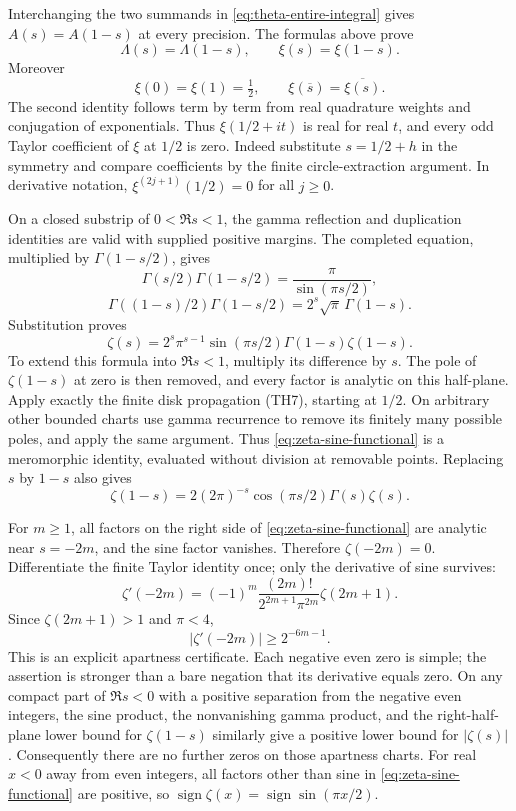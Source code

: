 Interchanging the two summands in \eqref{eq:theta-entire-integral}
gives $A(s)=A(1-s)$ at every precision.  The formulas above prove
\begin{equation}
 \boxed{\Lambda(s)=\Lambda(1-s),\qquad \xi(s)=\xi(1-s).}
 \label{eq:completed-functional-equation}
\end{equation}
Moreover
\[
 \xi(0)=\xi(1)=\tfrac12,\qquad
 \xi(\overline s)=\overline{\xi(s)}.
\]
The second identity follows term by term from real quadrature weights
and conjugation of exponentials.  Thus $\xi(1/2+it)$ is real for
real $t$, and every odd Taylor coefficient of $\xi$ at $1/2$ is zero.
Indeed substitute $s=1/2+h$ in the symmetry and compare coefficients
by the finite circle-extraction argument.  In derivative notation,
$\xi^{(2j+1)}(1/2)=0$ for all $j\ge0$.

On a closed substrip of $0<\Re s<1$, the gamma reflection and
 duplication identities are valid with supplied positive margins.
The completed equation, multiplied by $\Gamma(1-s/2)$, gives
\[
 \Gamma(s/2)\Gamma(1-s/2)=\frac\pi{\sin(\pi s/2)},
\]
\[
 \Gamma((1-s)/2)\Gamma(1-s/2)
                       =2^s\sqrt\pi\,\Gamma(1-s).
\]
Substitution proves
\begin{equation}
 \boxed{\displaystyle
 \zeta(s)=2^s\pi^{s-1}\sin(\pi s/2)
                        \Gamma(1-s)\zeta(1-s).}
 \label{eq:zeta-sine-functional}
\end{equation}
To extend this formula into $\Re s<1$, multiply its difference by
$s$.  The pole of $\zeta(1-s)$ at zero is then removed, and every
factor is analytic on this half-plane.  Apply exactly the finite
disk propagation (TH7), starting at $1/2$.  On arbitrary other bounded
charts use gamma recurrence to remove its finitely many possible
poles, and apply the same argument.  Thus
\eqref{eq:zeta-sine-functional} is a meromorphic identity, evaluated
without division at removable points.  Replacing $s$ by $1-s$ also
gives
\[
 \zeta(1-s)=2(2\pi)^{-s}\cos(\pi s/2)\Gamma(s)\zeta(s).
\]

For $m\ge1$, all factors on the right side of
\eqref{eq:zeta-sine-functional} are analytic near $s=-2m$, and the
sine factor vanishes.  Therefore $\zeta(-2m)=0$.  Differentiate the
finite Taylor identity once; only the derivative of sine survives:
\begin{equation}
 \boxed{\displaystyle
 \zeta'(-2m)=(-1)^m\frac{(2m)!}{2^{2m+1}\pi^{2m}}
                              \zeta(2m+1).}
 \label{eq:trivial-zero-derivative}
\end{equation}
Since $\zeta(2m+1)>1$ and $\pi<4$,
\[
 |\zeta'(-2m)|\ge2^{-6m-1}.                         \tag{TH11}
\]
This is an explicit apartness certificate.  Each negative even zero
is simple; the assertion is stronger than a bare negation that its
derivative equals zero.  On any compact part of $\Re s<0$ with a
positive separation from the negative even integers, the sine product,
the nonvanishing gamma product, and the right-half-plane lower bound
for $\zeta(1-s)$ similarly give a positive lower bound for $|\zeta(s)|$.
Consequently there are no further zeros on those apartness charts.
For real $x<0$ away from even integers, all factors other than sine in
\eqref{eq:zeta-sine-functional} are positive, so
$\operatorname{sign}\zeta(x)=\operatorname{sign}\sin(\pi x/2)$.

